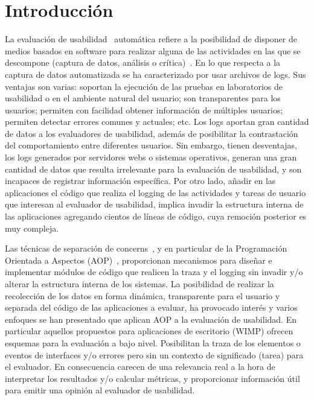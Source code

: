 \section{Introducción}
\label{sec:intro}

La evaluación de usabilidad~\cite{ISO1998} automática refiere a la posibilidad de disponer de medios basados en software para realizar alguna de las actividades en las que se descompone (captura de datos, análisis o crítica)~\cite{IH2001}. En lo que respecta a la captura de datos automatizada se ha caracterizado por usar archivos de logs. Sus ventajas son varias: soportan la ejecución de las pruebas en laboratorios de usabilidad o en el ambiente natural del usuario; son transparentes para los usuarios; permiten con facilidad obtener información de múltiples usuarios; permiten detectar errores comunes y actuales; etc. Los logs aportan gran cantidad de datos a los evaluadores de usabilidad, además de posibilitar la contrastación del comportamiento entre diferentes usuarios. Sin embargo, tienen desventajas, los logs generados por servidores webs o sistemas operativos, generan una gran cantidad de datos que resulta irrelevante para la evaluación de usabilidad, y son incapaces de registrar información específica. Por otro lado, añadir en las aplicaciones el código que realiza el logging de las actividades y  tareas de usuario que interesan al evaluador de usabilidad, implica invadir la estructura interna de las aplicaciones agregando cientos de líneas de código, cuya remoción posterior es muy compleja.

Las técnicas de separación de concerns~\cite{KLM+1997}, y en particular de la Programación Orientada a Aspectos (AOP)~\cite{NIELSEN1992}, proporcionan mecanismos para diseñar e implementar módulos de código que realicen la traza y el logging sin invadir y/o alterar la estructura interna de los sistemas. La posibilidad de realizar la recolección de los datos en forma dinámica, transparente para el usuario y separada del código de las aplicaciones a evaluar, ha provocado interés y varios enfoques se han presentado que aplican AOP a la evaluación de usabilidad. En particular aquellos propuestos para aplicaciones de escritorio (WIMP) ofrecen esquemas para la evaluación a bajo nivel. Posibilitan la traza de los elementos o eventos de interfaces y/o errores pero sin un contexto de significado (tarea) para el evaluador. En consecuencia carecen de una relevancia real a la hora de interpretar los resultados y/o calcular métricas, y proporcionar información útil para emitir una opinión al evaluador de usabilidad. 

